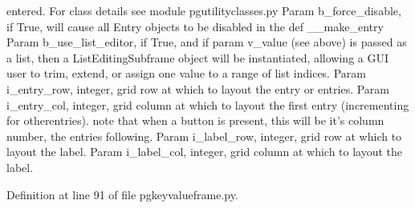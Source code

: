 \begin{DoxyVerb}
      entered. For class details see module pgutilityclasses.py
Param b_force_disable, if True, will cause all Entry objects to be disabled 
      in the def __make_entry
Param b_use_list_editor, if True, and if param v_value (see above) is passed as a list, 
      then a ListEditingSubframe object will be instantiated, allowing a GUI user to
      trim, extend, or assign one value to a range of list indices.
Param i_entry_row, integer, grid row at which to layout the entry or entries.
Param i_entry_col, integer, grid column at which to layout the first entry (incrementing for otherentries).
note that when a button is present, this will be it's column number, the entries following. 
Param i_label_row, integer, grid row at which to layout the label.
Param i_label_col, integer, grid column at which to layout the label.
\end{DoxyVerb}
 

Definition at line 91 of file pgkeyvalueframe.\+py.


